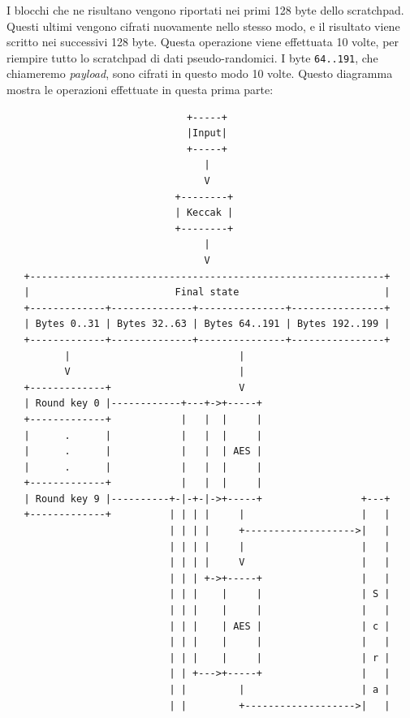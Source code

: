 I blocchi che ne risultano vengono riportati nei primi 128 byte dello
scratchpad. Questi ultimi vengono cifrati nuovamente nello stesso modo,
e il risultato viene scritto nei successivi 128 byte. Questa operazione
viene effettuata 10 volte, per riempire tutto lo scratchpad di dati
pseudo-randomici. I byte \texttt{64..191}, che chiameremo
\emph{payload}, sono cifrati in questo modo 10 volte. Questo diagramma
mostra le operazioni effettuate in questa prima parte:

\begin{verbatim}
                               +-----+
                               |Input|
                               +-----+
                                  |
                                  V
                             +--------+
                             | Keccak |
                             +--------+
                                  |
                                  V
   +-------------------------------------------------------------+
   |                         Final state                         |
   +-------------+--------------+---------------+----------------+
   | Bytes 0..31 | Bytes 32..63 | Bytes 64..191 | Bytes 192..199 |
   +-------------+--------------+---------------+----------------+
          |                             |
          V                             |
   +-------------+                      V
   | Round key 0 |------------+---+->+-----+
   +-------------+            |   |  |     |
   |      .      |            |   |  |     |
   |      .      |            |   |  | AES |
   |      .      |            |   |  |     |
   +-------------+            |   |  |     |
   | Round key 9 |----------+-|-+-|->+-----+                 +---+
   +-------------+          | | | |     |                    |   |
                            | | | |     +------------------->|   |
                            | | | |     |                    |   |
                            | | | |     V                    |   |
                            | | | +->+-----+                 |   |
                            | | |    |     |                 | S |
                            | | |    |     |                 |   |
                            | | |    | AES |                 | c |
                            | | |    |     |                 |   |
                            | | |    |     |                 | r |
                            | | +--->+-----+                 |   |
                            | |         |                    | a |
                            | |         +------------------->|   |

\end{verbatim}

